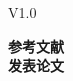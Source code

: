 \def\allfiles{}


{\huge V1.0}

\thispagestyle{empty} %
    \vspace{-1em}
    \newpage
    \tableofcontents
    \noindent\textbf{参考文献}\\
    \noindent\textbf{发表论文}





% 
% 
% 
% 


\clearpage

